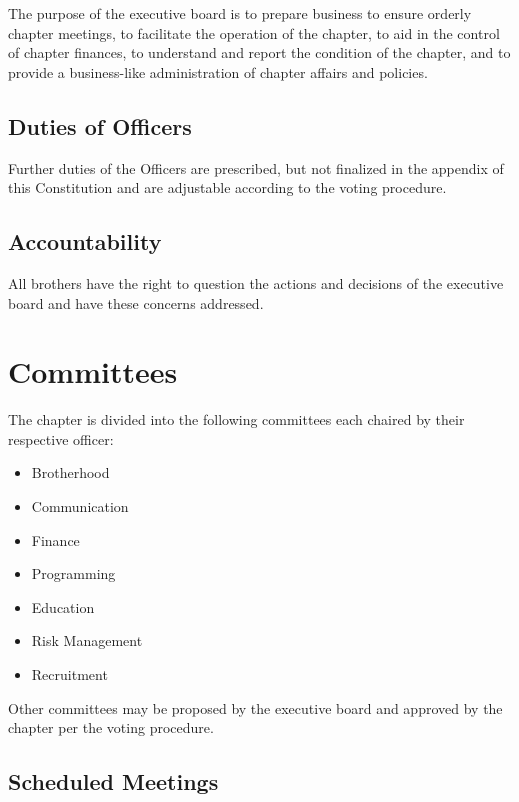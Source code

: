The purpose of the executive board is to prepare business to ensure orderly
chapter meetings, to facilitate the operation of the chapter, to aid in the
control of chapter finances, to understand and report the condition of the
chapter, and to provide a business-like administration of chapter affairs and
policies.

\subsection{Duties of Officers}
\label{sec:duties-of-officers}

Further duties of the Officers are prescribed, but not finalized in the appendix
of this Constitution and are adjustable according to the voting procedure.

\subsection{Accountability}
\label{sec:accountability}

All brothers have the right to question the actions and decisions of the
executive board and have these concerns addressed.

\section{Committees}
\label{sec:committees}

The chapter is divided into the following committees each chaired by their
respective officer: 

\begin{itemize}
	\item Brotherhood
	\item Communication
	\item Finance
	\item Programming
	\item Education
	\item Risk Management
	\item Recruitment
\end{itemize}

Other committees may be proposed by the executive board and approved by the
chapter per the voting procedure.

\subsection{Scheduled Meetings}
\label{sec:committee-scheduled-meetings}

